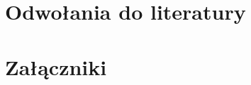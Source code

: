 \documentclass[11pt,oneside,a4paper,titlepage,onecolumn]{article}
\begin{document}
\section{Odwołania do literatury}

\section{Załączniki}








  
  
\end{document}
